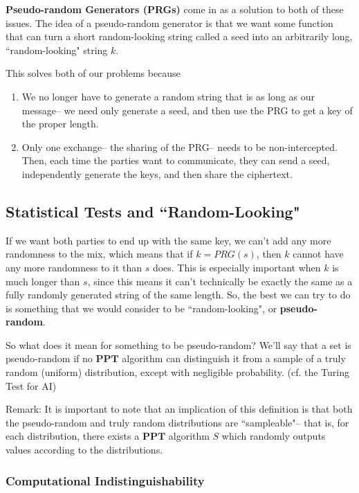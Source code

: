 \documentclass[11pt]{article}
\newcommand{\PPT}{\mathbf{PPT}}
\begin{document}
\textbf{Pseudo-random Generators (PRGs)} come in as a solution to both of these issues. The idea of a pseudo-random generator is that we want some function that can turn a short random-looking string called a seed into an arbitrarily long, ``random-looking" string \(k\).\smallskip

This solves both of our problems because
\begin{enumerate}
\item We no longer have to generate a random string that is as long as our message-- we need only generate a seed, and then use the PRG to get a key of the proper length.
\item Only one exchange-- the sharing of the PRG-- needs to be non-intercepted. Then, each time the parties want to communicate, they can send a seed, independently generate the keys, and then share the ciphertext.
\end{enumerate}


\subsection{Statistical Tests and ``Random-Looking"}
If we want both parties to end up with the same key, we can't add any more randomness to the mix, which means that if \(k=PRG(s)\), then \(k\) cannot have any more randomness to it than \(s\) does. This is especially important when \(k\) is much longer than \(s\), since this means it can't technically be exactly the same as a fully randomly generated string of the same length. So, the best we can try to do is something that we would consider to be ``random-looking", or \textbf{pseudo-random}.\medskip

So what does it mean for something to be pseudo-random? We'll say that a set is pseudo-random if no \(\PPT\) algorithm can distinguish it from a sample of a truly random (uniform) distribution, except with negligible probability. (cf. the Turing Test for AI)\smallskip

Remark: It is important to note that an implication of this definition is that both the pseudo-random and truly random distributions are ``sampleable"-- that is, for each distribution, there exists a \(\PPT\) algorithm \(S\) which randomly outputs values according to the distributions.\smallskip

\subsubsection{Computational Indistinguishability}
\end{document}
